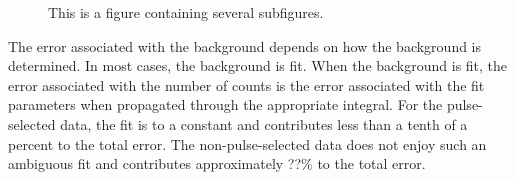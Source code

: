 \begin{figure}[ht]
\centering
  
  

  \caption{This is a figure containing several subfigures.}
  \label{fig:statDist}
\end{figure}

The error associated with the background depends on how the background is determined.  In most cases, the background is fit.  When the background is fit, the error associated with the number of counts is the error associated with the fit parameters when propagated through the appropriate integral.  For the pulse-selected data, the fit is to a constant and contributes less than a tenth of a percent to the total error.  The non-pulse-selected data does not enjoy such an ambiguous fit and contributes approximately ??\% to the total error.

